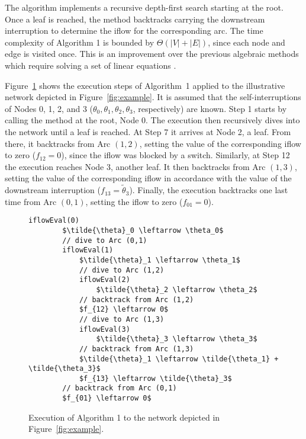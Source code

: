 \documentclass{article}
\begin{document}
The algorithm implements a recursive depth-first search starting at the root. Once a leaf is reached, the method backtracks carrying the downstream interruption to determine the iflow for the corresponding arc. The time complexity of Algorithm 1 is bounded by $\Theta(|V|+|E|)$, since each node and edge is visited once. This is an improvement over the previous algebraic methods which require solving a set of linear equations \cite{DelgadoContrerasArroyo2018, TabaresEtal2019, LiEtAl2020a, Contreras2020}.


Figure~\ref{fig:code-execution} shows the execution steps of Algorithm~1 applied to the illustrative network depicted in Figure~\ref{fig:example}. It is assumed that the self-interruptions of Nodes 0, 1, 2, and 3 ($\theta_0, \theta_1, \theta_2, \theta_3$, respectively) are known. Step 1 starts by calling the method at the root, Node 0. The execution then recursively dives into the network until a leaf is reached. At Step 7 it arrives at Node 2, a leaf. From there, it backtracks from Arc $(1,2)$, setting the value of the corresponding iflow to zero ($f_{12} = 0$), since the iflow was blocked by a switch. Similarly, at Step 12 the execution reaches Node 3, another leaf. It then backtracks from Arc $(1,3)$, setting the value of the corresponding iflow in accordance with the value of the downstream interruption ($f_{13} = \tilde{\theta}_3$). Finally, the execution backtracks one last time from Arc $(0,1)$, setting the iflow to zero ($f_{01} = 0$). 

\begin{figure}
    \centering
    \begin{lstlisting}[mathescape]
    iflowEval(0)
        $\tilde{\theta}_0 \leftarrow \theta_0$
        // dive to Arc (0,1)
        iflowEval(1)
            $\tilde{\theta}_1 \leftarrow \theta_1$
            // dive to Arc (1,2)
            iflowEval(2)
                $\tilde{\theta}_2 \leftarrow \theta_2$
            // backtrack from Arc (1,2)
            $f_{12} \leftarrow 0$
            // dive to Arc (1,3)
            iflowEval(3)
                $\tilde{\theta}_3 \leftarrow \theta_3$
            // backtrack from Arc (1,3)
            $\tilde{\theta}_1 \leftarrow \tilde{\theta_1} + \tilde{\theta_3}$
            $f_{13} \leftarrow \tilde{\theta}_3$
        // backtrack from Arc (0,1)
        $f_{01} \leftarrow 0$
\end{lstlisting}
\vspace{-1cm}
    \caption{Execution of Algorithm 1 to the network depicted in Figure~\ref{fig:example}.}
    \label{fig:code-execution}
\end{figure}
\end{document}
